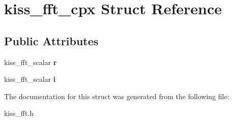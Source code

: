 \hypertarget{structkiss__fft__cpx}{\section{kiss\-\_\-fft\-\_\-cpx Struct Reference}
\label{structkiss__fft__cpx}
}
\subsection*{Public Attributes}
\begin{DoxyCompactItemize}
\item 
\hypertarget{structkiss__fft__cpx_a686b6187e3e885de316908319c71ea8f}{kiss\-\_\-fft\-\_\-scalar {\bfseries r}}\label{structkiss__fft__cpx_a686b6187e3e885de316908319c71ea8f}

\item 
\hypertarget{structkiss__fft__cpx_ac1e17add2ae6b815da29d7d67b03fa70}{kiss\-\_\-fft\-\_\-scalar {\bfseries i}}\label{structkiss__fft__cpx_ac1e17add2ae6b815da29d7d67b03fa70}

\end{DoxyCompactItemize}


The documentation for this struct was generated from the following file\-:\begin{DoxyCompactItemize}
\item 
kiss\-\_\-fft.\-h\end{DoxyCompactItemize}
